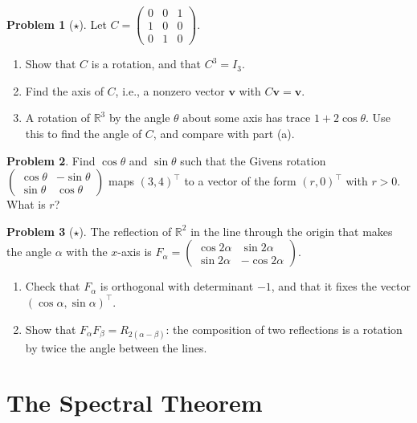 \documentclass[11pt]{article}
\theoremstyle{definition}
\newtheorem{problem}{Problem}[section]
\begin{document}
\begin{problem}[$\star$]\label{pr:rot-axis}
    Let $C = \begin{pmatrix} 0 & 0 & 1 \\ 1 & 0 & 0 \\ 0 & 1 & 0 \end{pmatrix}$.
    \begin{enumerate}[label=(\alph*)]
        \item Show that $C$ is a rotation, and that $C^3 = I_3$.
        \item Find the axis of $C$, i.e., a nonzero vector $\mathbf{v}$ with $C\mathbf{v} = \mathbf{v}$.
        \item A rotation of $\mathbb{R}^3$ by the angle $\theta$ about some axis has trace $1 + 2\cos\theta$. Use this to find the angle of $C$, and compare with part (a).
    \end{enumerate}
\end{problem}

\begin{problem}\label{pr:givens}
    Find $\cos\theta$ and $\sin\theta$ such that the Givens rotation $\begin{pmatrix} \cos\theta & -\sin\theta \\ \sin\theta & \cos\theta \end{pmatrix}$ maps $(3, 4)^\top$ to a vector of the form $(r, 0)^\top$ with $r > 0$. What is $r$?
\end{problem}

\begin{problem}[$\star$]\label{pr:reflections}
    The reflection of $\mathbb{R}^2$ in the line through the origin that makes the angle $\alpha$ with the $x$-axis is $F_\alpha = \begin{pmatrix} \cos 2\alpha & \sin 2\alpha \\ \sin 2\alpha & -\cos 2\alpha \end{pmatrix}$.
    \begin{enumerate}[label=(\alph*)]
        \item Check that $F_\alpha$ is orthogonal with determinant $-1$, and that it fixes the vector $(\cos\alpha, \sin\alpha)^\top$.
        \item Show that $F_\alpha F_\beta = R_{2(\alpha - \beta)}$: the composition of two reflections is a rotation by twice the angle between the lines.
    \end{enumerate}
\end{problem}

\section{The Spectral Theorem}
\end{document}
